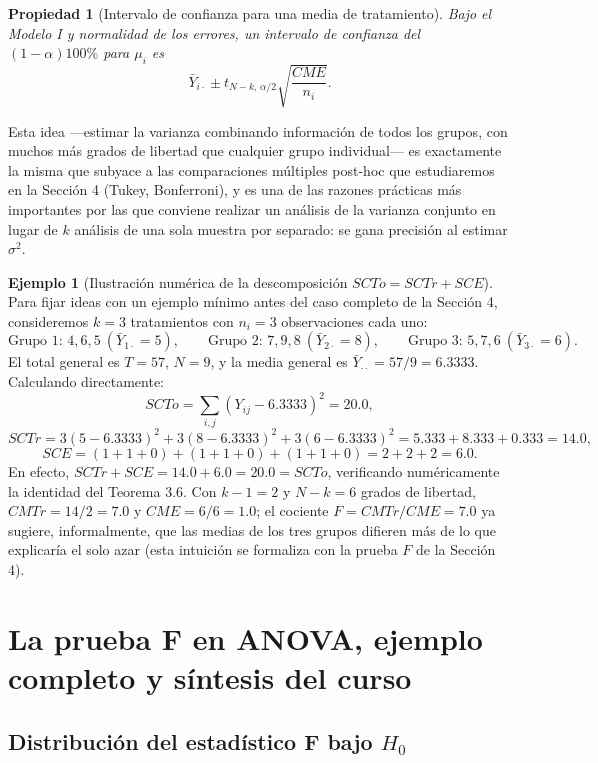 \documentclass[11pt,a4paper]{article}
\theoremstyle{plain}
\newtheorem{propiedad}[teorema]{Propiedad}
\theoremstyle{definition}
\newtheorem{ejemplo}[teorema]{Ejemplo}
\theoremstyle{remark}
\begin{document}
\begin{propiedad}[Intervalo de confianza para una media de tratamiento]
Bajo el Modelo I y normalidad de los errores, un intervalo de confianza del $(1-\alpha)100\%$ para $\mu_i$ es
\[
\bar Y_{i\cdot} \pm t_{N-k,\,\alpha/2}\sqrt{\frac{CME}{n_i}}.
\]
\end{propiedad}

Esta idea —estimar la varianza combinando información de todos los grupos, con muchos más grados de libertad que cualquier grupo individual— es exactamente la misma que subyace a las comparaciones múltiples post-hoc que estudiaremos en la Sección 4 (Tukey, Bonferroni), y es una de las razones prácticas más importantes por las que conviene realizar un análisis de la varianza conjunto en lugar de $k$ análisis de una sola muestra por separado: se gana precisión al estimar $\sigma^2$.

\begin{ejemplo}[Ilustración numérica de la descomposición $SCTo=SCTr+SCE$]
Para fijar ideas con un ejemplo mínimo antes del caso completo de la Sección 4, consideremos $k=3$ tratamientos con $n_i=3$ observaciones cada uno:
\[
\text{Grupo 1: } 4,6,5 \ (\bar Y_{1\cdot}=5), \qquad \text{Grupo 2: } 7,9,8\ (\bar Y_{2\cdot}=8), \qquad \text{Grupo 3: } 5,7,6\ (\bar Y_{3\cdot}=6).
\]
El total general es $T=57$, $N=9$, y la media general es $\bar Y_{\cdot\cdot}=57/9=6.3333$. Calculando directamente:
\[
SCTo = \sum_{i,j}(Y_{ij}-6.3333)^2 = 20.0,
\]
\[
SCTr = 3(5-6.3333)^2+3(8-6.3333)^2+3(6-6.3333)^2 = 5.333+8.333+0.333 = 14.0,
\]
\[
SCE = (1+1+0)+(1+1+0)+(1+1+0) = 2+2+2=6.0.
\]
En efecto, $SCTr+SCE=14.0+6.0=20.0=SCTo$, verificando numéricamente la identidad del Teorema 3.6. Con $k-1=2$ y $N-k=6$ grados de libertad, $CMTr=14/2=7.0$ y $CME=6/6=1.0$; el cociente $F=CMTr/CME=7.0$ ya sugiere, informalmente, que las medias de los tres grupos difieren más de lo que explicaría el solo azar (esta intuición se formaliza con la prueba $F$ de la Sección 4).
\end{ejemplo}

\newpage
\section{La prueba F en ANOVA, ejemplo completo y síntesis del curso}

\subsection{Distribución del estadístico F bajo \texorpdfstring{$H_0$}{H0}}
\end{document}
